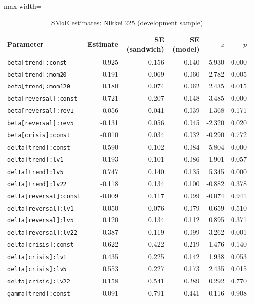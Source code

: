 \begin{table}[!htbp]\centering\scriptsize
\caption{SMoE estimates: Nikkei 225 (development sample)}\label{tab:params_n225}
\begin{adjustbox}{max width=\textwidth}
\begin{tabular}{lrrrrr}
\toprule
Parameter & Estimate & SE (sandwich) & SE (model) & $z$ & $p$\\
\midrule
\texttt{beta[trend]:const} & -0.925 & 0.156 & 0.140 & -5.930 & 0.000\\
\texttt{beta[trend]:mom20} & 0.191 & 0.069 & 0.060 & 2.782 & 0.005\\
\texttt{beta[trend]:mom120} & -0.180 & 0.074 & 0.062 & -2.435 & 0.015\\
\texttt{beta[reversal]:const} & 0.721 & 0.207 & 0.148 & 3.485 & 0.000\\
\texttt{beta[reversal]:rev1} & -0.056 & 0.041 & 0.039 & -1.368 & 0.171\\
\texttt{beta[reversal]:rev5} & -0.131 & 0.056 & 0.045 & -2.320 & 0.020\\
\texttt{beta[crisis]:const} & -0.010 & 0.034 & 0.032 & -0.290 & 0.772\\
\texttt{delta[trend]:const} & 0.590 & 0.102 & 0.084 & 5.804 & 0.000\\
\texttt{delta[trend]:lv1} & 0.193 & 0.101 & 0.086 & 1.901 & 0.057\\
\texttt{delta[trend]:lv5} & 0.747 & 0.140 & 0.135 & 5.345 & 0.000\\
\texttt{delta[trend]:lv22} & -0.118 & 0.134 & 0.100 & -0.882 & 0.378\\
\texttt{delta[reversal]:const} & -0.009 & 0.117 & 0.099 & -0.074 & 0.941\\
\texttt{delta[reversal]:lv1} & 0.050 & 0.076 & 0.079 & 0.659 & 0.510\\
\texttt{delta[reversal]:lv5} & 0.120 & 0.134 & 0.112 & 0.895 & 0.371\\
\texttt{delta[reversal]:lv22} & 0.387 & 0.119 & 0.099 & 3.262 & 0.001\\
\texttt{delta[crisis]:const} & -0.622 & 0.422 & 0.219 & -1.476 & 0.140\\
\texttt{delta[crisis]:lv1} & 0.435 & 0.225 & 0.142 & 1.938 & 0.053\\
\texttt{delta[crisis]:lv5} & 0.553 & 0.227 & 0.173 & 2.435 & 0.015\\
\texttt{delta[crisis]:lv22} & -0.158 & 0.541 & 0.289 & -0.292 & 0.770\\
\texttt{gamma[trend]:const} & -0.091 & 0.791 & 0.441 & -0.116 & 0.908\\

\end{tabular}
\end{adjustbox}
\end{table}
